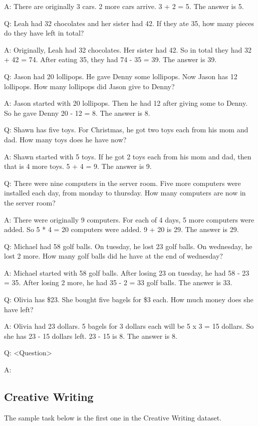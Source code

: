 \documentclass[11pt]{article}
\begin{document}
A: There are originally 3 cars. 2 more cars arrive. 3 + 2 = 5. The answer is 5.

Q: Leah had 32 chocolates and her sister had 42. If they ate 35, how many pieces do they have left in total?

A: Originally, Leah had 32 chocolates. Her sister had 42. So in total they had 32 + 42 = 74. After eating 35, they had 74 - 35 = 39. The answer is 39.

Q: Jason had 20 lollipops. He gave Denny some lollipops. Now Jason has 12 lollipops. How many lollipops did Jason give to Denny?

A: Jason started with 20 lollipops. Then he had 12 after giving some to Denny. So he gave Denny 20 - 12 = 8. The answer is 8.

Q: Shawn has five toys. For Christmas, he got two toys each from his mom and dad. How many toys does he have now?

A: Shawn started with 5 toys. If he got 2 toys each from his mom and dad, then that is 4 more toys. 5 + 4 = 9. The answer is 9.

Q: There were nine computers in the server room. Five more computers were installed each day, from monday to thursday. How many computers are now in the server room?

A: There were originally 9 computers. For each of 4 days, 5 more computers were added. So 5 * 4 = 20 computers were added. 9 + 20 is 29. The answer is 29.

Q: Michael had 58 golf balls. On tuesday, he lost 23 golf balls. On wednesday, he lost 2 more. How many golf balls did he have at the end of wednesday?

A: Michael started with 58 golf balls. After losing 23 on tuesday, he had 58 - 23 = 35. After losing 2 more, he had 35 - 2 = 33 golf balls. The answer is 33.

Q: Olivia has \$23. She bought five bagels for \$3 each. How much money does she have left?

A: Olivia had 23 dollars. 5 bagels for 3 dollars each will be 5 x 3 = 15 dollars. So she has 23 - 15 dollars left. 23 - 15 is 8. The answer is 8.

Q: <Question>

A:

\subsection{Creative Writing}

The sample task below is the first one in the Creative Writing dataset. \cite{yao_tree_2023}
\end{document}
